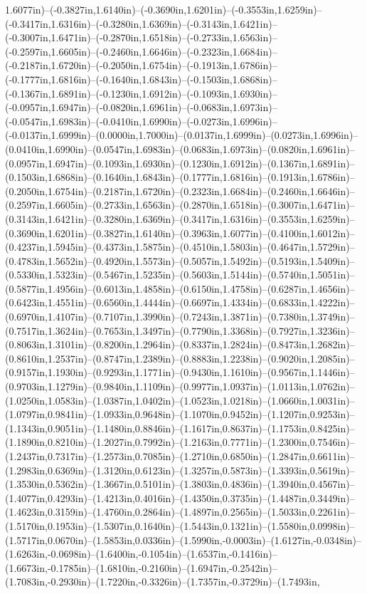1.6077in)--(-0.3827in,1.6140in)--(-0.3690in,1.6201in)--(-0.3553in,1.6259in)--(-0.3417in,1.6316in)--(-0.3280in,1.6369in)--(-0.3143in,1.6421in)--(-0.3007in,1.6471in)--(-0.2870in,1.6518in)--(-0.2733in,1.6563in)--(-0.2597in,1.6605in)--(-0.2460in,1.6646in)--(-0.2323in,1.6684in)--(-0.2187in,1.6720in)--(-0.2050in,1.6754in)--(-0.1913in,1.6786in)--(-0.1777in,1.6816in)--(-0.1640in,1.6843in)--(-0.1503in,1.6868in)--(-0.1367in,1.6891in)--(-0.1230in,1.6912in)--(-0.1093in,1.6930in)--(-0.0957in,1.6947in)--(-0.0820in,1.6961in)--(-0.0683in,1.6973in)--(-0.0547in,1.6983in)--(-0.0410in,1.6990in)--(-0.0273in,1.6996in)--(-0.0137in,1.6999in)--(0.0000in,1.7000in)--(0.0137in,1.6999in)--(0.0273in,1.6996in)--(0.0410in,1.6990in)--(0.0547in,1.6983in)--(0.0683in,1.6973in)--(0.0820in,1.6961in)--(0.0957in,1.6947in)--(0.1093in,1.6930in)--(0.1230in,1.6912in)--(0.1367in,1.6891in)--(0.1503in,1.6868in)--(0.1640in,1.6843in)--(0.1777in,1.6816in)--(0.1913in,1.6786in)--(0.2050in,1.6754in)--(0.2187in,1.6720in)--(0.2323in,1.6684in)--(0.2460in,1.6646in)--(0.2597in,1.6605in)--(0.2733in,1.6563in)--(0.2870in,1.6518in)--(0.3007in,1.6471in)--(0.3143in,1.6421in)--(0.3280in,1.6369in)--(0.3417in,1.6316in)--(0.3553in,1.6259in)--(0.3690in,1.6201in)--(0.3827in,1.6140in)--(0.3963in,1.6077in)--(0.4100in,1.6012in)--(0.4237in,1.5945in)--(0.4373in,1.5875in)--(0.4510in,1.5803in)--(0.4647in,1.5729in)--(0.4783in,1.5652in)--(0.4920in,1.5573in)--(0.5057in,1.5492in)--(0.5193in,1.5409in)--(0.5330in,1.5323in)--(0.5467in,1.5235in)--(0.5603in,1.5144in)--(0.5740in,1.5051in)--(0.5877in,1.4956in)--(0.6013in,1.4858in)--(0.6150in,1.4758in)--(0.6287in,1.4656in)--(0.6423in,1.4551in)--(0.6560in,1.4444in)--(0.6697in,1.4334in)--(0.6833in,1.4222in)--(0.6970in,1.4107in)--(0.7107in,1.3990in)--(0.7243in,1.3871in)--(0.7380in,1.3749in)--(0.7517in,1.3624in)--(0.7653in,1.3497in)--(0.7790in,1.3368in)--(0.7927in,1.3236in)--(0.8063in,1.3101in)--(0.8200in,1.2964in)--(0.8337in,1.2824in)--(0.8473in,1.2682in)--(0.8610in,1.2537in)--(0.8747in,1.2389in)--(0.8883in,1.2238in)--(0.9020in,1.2085in)--(0.9157in,1.1930in)--(0.9293in,1.1771in)--(0.9430in,1.1610in)--(0.9567in,1.1446in)--(0.9703in,1.1279in)--(0.9840in,1.1109in)--(0.9977in,1.0937in)--(1.0113in,1.0762in)--(1.0250in,1.0583in)--(1.0387in,1.0402in)--(1.0523in,1.0218in)--(1.0660in,1.0031in)--(1.0797in,0.9841in)--(1.0933in,0.9648in)--(1.1070in,0.9452in)--(1.1207in,0.9253in)--(1.1343in,0.9051in)--(1.1480in,0.8846in)--(1.1617in,0.8637in)--(1.1753in,0.8425in)--(1.1890in,0.8210in)--(1.2027in,0.7992in)--(1.2163in,0.7771in)--(1.2300in,0.7546in)--(1.2437in,0.7317in)--(1.2573in,0.7085in)--(1.2710in,0.6850in)--(1.2847in,0.6611in)--(1.2983in,0.6369in)--(1.3120in,0.6123in)--(1.3257in,0.5873in)--(1.3393in,0.5619in)--(1.3530in,0.5362in)--(1.3667in,0.5101in)--(1.3803in,0.4836in)--(1.3940in,0.4567in)--(1.4077in,0.4293in)--(1.4213in,0.4016in)--(1.4350in,0.3735in)--(1.4487in,0.3449in)--(1.4623in,0.3159in)--(1.4760in,0.2864in)--(1.4897in,0.2565in)--(1.5033in,0.2261in)--(1.5170in,0.1953in)--(1.5307in,0.1640in)--(1.5443in,0.1321in)--(1.5580in,0.0998in)--(1.5717in,0.0670in)--(1.5853in,0.0336in)--(1.5990in,-0.0003in)--(1.6127in,-0.0348in)--(1.6263in,-0.0698in)--(1.6400in,-0.1054in)--(1.6537in,-0.1416in)--(1.6673in,-0.1785in)--(1.6810in,-0.2160in)--(1.6947in,-0.2542in)--(1.7083in,-0.2930in)--(1.7220in,-0.3326in)--(1.7357in,-0.3729in)--(1.7493in,